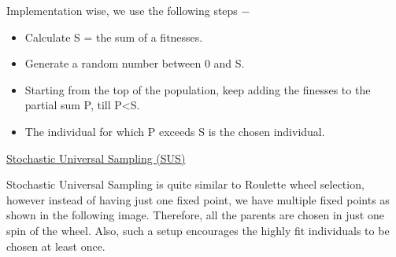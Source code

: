 \documentclass[12pt]{article}
\renewcommand{\_}{\kern-1.5pt\textunderscore\kern-1.5pt}
\begin{document}
\begin{enumerate}
\begin{justify}
Implementation wise, we use the following steps $-$ 
\end{justify}\par

\begin{itemize}
	\item Calculate S = the sum of a fitnesses.\par

	\item Generate a random number between 0 and S.\par

	\item Starting from the top of the population, keep adding the finesses to the partial sum P, till P<S.\par

	\item The individual for which P exceeds S is the chosen individual.
\end{itemize}\par


\vspace{\baselineskip}

\vspace{\baselineskip}
\begin{adjustwidth}{0.0in}{0.03in}
\begin{justify}
{\fontsize{14pt}{16.8pt}\selectfont \uline{Stochastic Universal Sampling (SUS)}\par}
\end{justify}\par

\end{adjustwidth}


\vspace{\baselineskip}
\begin{adjustwidth}{0.03in}{0.03in}
\begin{justify}
Stochastic Universal Sampling is quite similar to Roulette wheel selection, however instead of having just one fixed point, we have multiple fixed points as shown in the following image. Therefore, all the parents are chosen in just one spin of the wheel. Also, such a setup encourages the highly fit individuals to be chosen at least once.
\end{justify}\par

\end{adjustwidth}




\end{enumerate}
\end{document}
